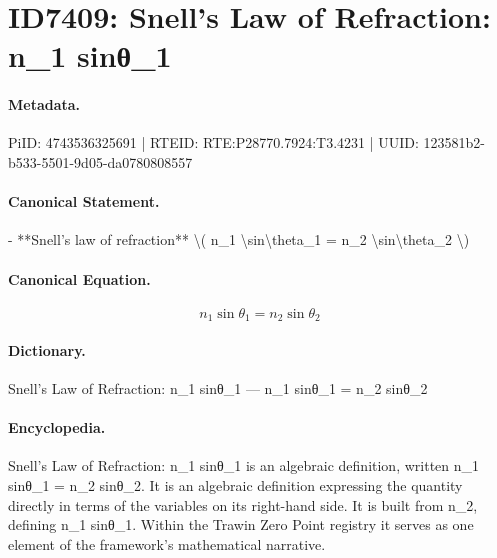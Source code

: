 \section*{ID7409: Snell’s Law of Refraction: n\_1 sinθ\_1}
\paragraph{Metadata.}
PiID: 4743536325691 | RTEID: RTE:P28770.7924:T3.4231 | UUID: 123581b2-b533-5501-9d05-da0780808557

\paragraph{Canonical Statement.}
- **Snell’s law of refraction** \textbackslash{}( n\_1 \textbackslash{}sin\textbackslash{}theta\_1 = n\_2 \textbackslash{}sin\textbackslash{}theta\_2 \textbackslash{})

\paragraph{Canonical Equation.}
\[
n_1 \sin\theta_1 = n_2 \sin\theta_2
\]

\paragraph{Dictionary.}
Snell’s Law of Refraction: n\_1 sinθ\_1 — n\_1 sinθ\_1 = n\_2 sinθ\_2

\paragraph{Encyclopedia.}
Snell’s Law of Refraction: n\_1 sinθ\_1 is an algebraic definition, written n\_1 sinθ\_1 = n\_2 sinθ\_2. It is an algebraic definition expressing the quantity directly in terms of the variables on its right-hand side. It is built from n\_2, defining n\_1 sinθ\_1. Within the Trawin Zero Point registry it serves as one element of the framework's mathematical narrative.
